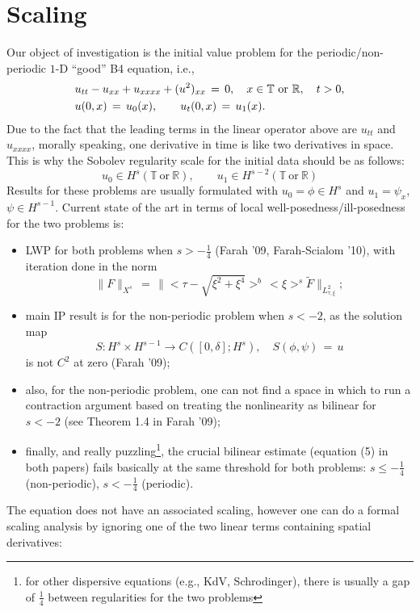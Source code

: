 \documentclass[12pt,reqno]{amsart}
\numberwithin{equation}{section}  %
\begin{document}
\section{Scaling} 
\label{sec:scaling}
Our object of investigation is the initial value problem for the
periodic/non-periodic $1$-D ``good'' B4 equation, i.e.,
\begin{equation}
\aligned
& u_{tt}-u_{xx}+u_{xxxx}+ (u^2)_{xx}\,=\,0, \quad x\in \mathbb{T}\ \text{or} \ \mathbb{R}, \quad t>0,\\
&u(0,x)\,=\,u_0(x),\qquad u_t(0,x)\,=\,u_1(x).\endaligned
\label{main}
\end{equation}
Due to the fact that the leading terms in the linear operator above are $u_{tt}$ and $u_{xxxx}$, morally speaking, one derivative in time is like two derivatives in space. This is why the Sobolev regularity scale for the initial data should be as follows:
\[
u_0\in H^s(\mathbb{T}\ \text{or} \ \mathbb{R}), \qquad u_1\in H^{s-2}(\mathbb{T}\ \text{or} \ \mathbb{R})
\]
Results for these problems are usually formulated with $u_0=\phi \in H^s$ and $u_1=\psi_x$, $\psi\in H^{s-1}$.
Current state of the art in terms of local well-posedness/ill-posedness for the two problems is:
\begin{itemize}
\item LWP for both problems when $s>-\frac 14$ (Farah '09, Farah-Scialom '10), with iteration done in
the norm
\[
\|F\|_{X^{s}}\,=\,\|<\tau-\sqrt{\xi^2+\xi^4}>^b\,<\xi>^s \tilde{F}\|_{L^2_{\tau,\xi}};
\]
\item main IP result is for the non-periodic problem when $s<-2$, as the solution map 
\[
S: H^s\times H^{s-1} \to C([0,\delta]; H^s), \quad
S(\phi,\psi)\,=\,u
\]
is not $C^2$ at zero (Farah '09);
\item also, for the non-periodic problem, one can not find a space in which to run a contraction argument based on treating the nonlinearity as bilinear for $s<-2$ (see Theorem 1.4 in Farah '09);
\item finally, and really puzzling\footnote{for other dispersive equations (e.g., KdV, Schrodinger), there is usually a gap of $\frac 14$ between regularities for the two problems}, the crucial bilinear estimate (equation (5) in both papers) fails basically at the same threshold for both problems: $s\leq -\frac 14$ (non-periodic), $s<-\frac{1}{4}$ (periodic).
\end{itemize}
The equation does not have an associated scaling, however one can do a formal scaling analysis by ignoring one of the two linear terms containing spatial derivatives:
\end{document}
